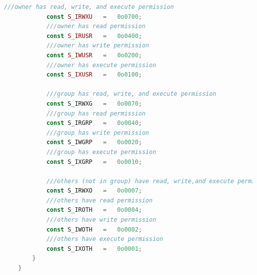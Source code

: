 \begin{lstlisting}[language={rust}, label={code:refill}, caption={FileDescriptor}]
            ///owner has read, write, and execute permission
            const S_IRWXU   =   0o0700;
            ///owner has read permission
            const S_IRUSR   =   0o0400;
            ///owner has write permission
            const S_IWUSR   =   0o0200;
            ///owner has execute permission
            const S_IXUSR   =   0o0100;

            ///group has read, write, and execute permission
            const S_IRWXG   =   0o0070;
            ///group has read permission
            const S_IRGRP   =   0o0040;
            ///group has write permission
            const S_IWGRP   =   0o0020;
            ///group has execute permission
            const S_IXGRP   =   0o0010;

            ///others (not in group) have read, write,and execute permission
            const S_IRWXO   =   0o0007;
            ///others have read permission
            const S_IROTH   =   0o0004;
            ///others have write permission
            const S_IWOTH   =   0o0002;
            ///others have execute permission
            const S_IXOTH   =   0o0001;
        }
    }
\end{lstlisting}

